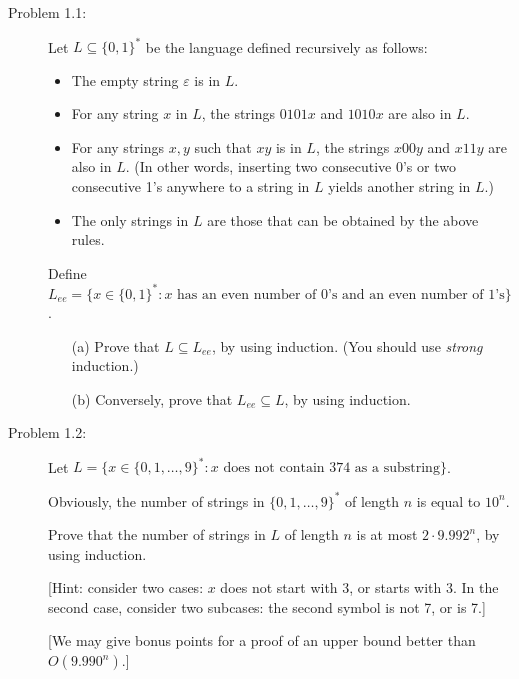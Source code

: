 \documentclass[11pt]{article}
\begin{document}
\newcommand{\eps}{\varepsilon}
\newcommand{\floor}[1]{\left\lfloor#1\right\rfloor}
\newcommand{\ceil}[1]{\left\lceil#1\right\rceil}


\newpage
\begin{description}
\item[Problem 1.1:]
Let $L\subseteq\{0,1\}^*$ be the language defined recursively 
as follows:
\begin{itemize}
\item The empty string $\eps$ is in $L$.
\item For any string $x$ in $L$,
the strings $0101x$ and $1010x$ are also in $L$.
\item For any strings $x,y$ such that $xy$ is in $L$, 
the strings $x00y$ and $x11y$ are also in $L$.
(In other words, inserting two consecutive 0's or two consecutive 1's anywhere to a string in $L$
yields another string in $L$.)
\item The only strings in $L$ are those that can be
obtained by the above rules.
\end{itemize}

Define $L_{ee}=\{ x\in\{0,1\}^*: \mbox{$x$ has an even number of 0's and an even number of 1's}\}$.
\begin{enumerate}
\item[(a)] Prove that $L \subseteq L_{ee}$, by using induction.  (You should use \emph{strong} induction.)
\item[(b)] Conversely, prove that $L_{ee}\subseteq L$, by using induction. 
\end{enumerate}

\bigskip
\item[Problem 1.2:]
Let $L=\{ x\in \{0,1,\ldots,9\}^*: \mbox{$x$ does not contain 374 as a substring}\}$.

Obviously, the number of strings in $\{0,1,\ldots,9\}^*$ of length $n$ is equal to $10^n$.

Prove that the number of strings in $L$ of length $n$ is at most $2\cdot 9.992^n$, by using induction.

[Hint: consider two cases: $x$ does not start with 3, or starts with 3.  In the second case, consider two subcases: the second symbol is not 7, or is 7.]

[We may give bonus points for a proof of an upper bound better than $O(9.990^n)$.]


\end{description}
\end{document}
